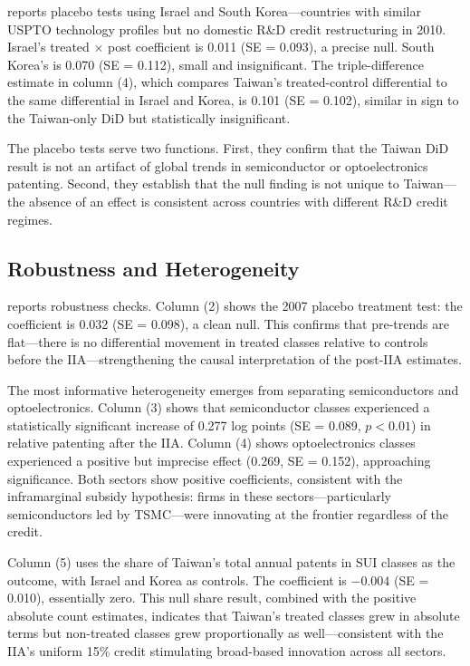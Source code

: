\documentclass[12pt]{article}
\begin{document}
 reports placebo tests using Israel and South Korea---countries with similar USPTO technology profiles but no domestic R\&D credit restructuring in 2010. Israel's treated $\times$ post coefficient is 0.011 (SE = 0.093), a precise null. South Korea's is 0.070 (SE = 0.112), small and insignificant. The triple-difference estimate in column (4), which compares Taiwan's treated-control differential to the same differential in Israel and Korea, is 0.101 (SE = 0.102), similar in sign to the Taiwan-only DiD but statistically insignificant.

The placebo tests serve two functions. First, they confirm that the Taiwan DiD result is not an artifact of global trends in semiconductor or optoelectronics patenting. Second, they establish that the null finding is not unique to Taiwan---the absence of an effect is consistent across countries with different R\&D credit regimes.

\subsection{Robustness and Heterogeneity}



 reports robustness checks. Column (2) shows the 2007 placebo treatment test: the coefficient is 0.032 (SE = 0.098), a clean null. This confirms that pre-trends are flat---there is no differential movement in treated classes relative to controls before the IIA---strengthening the causal interpretation of the post-IIA estimates.

The most informative heterogeneity emerges from separating semiconductors and optoelectronics. Column (3) shows that semiconductor classes experienced a statistically significant increase of 0.277 log points (SE = 0.089, $p < 0.01$) in relative patenting after the IIA. Column (4) shows optoelectronics classes experienced a positive but imprecise effect (0.269, SE = 0.152), approaching significance. Both sectors show positive coefficients, consistent with the inframarginal subsidy hypothesis: firms in these sectors---particularly semiconductors led by TSMC---were innovating at the frontier regardless of the credit.

Column (5) uses the share of Taiwan's total annual patents in SUI classes as the outcome, with Israel and Korea as controls. The coefficient is $-0.004$ (SE = 0.010), essentially zero. This null share result, combined with the positive absolute count estimates, indicates that Taiwan's treated classes grew in absolute terms but non-treated classes grew proportionally as well---consistent with the IIA's uniform 15\% credit stimulating broad-based innovation across all sectors.
\end{document}
